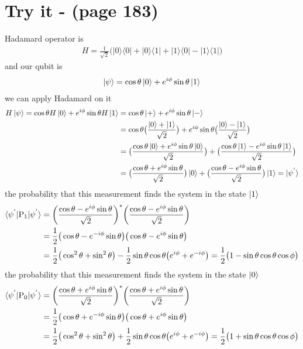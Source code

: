 \documentclass{article}
\newcommand{\op}[2]{|#1\rangle \langle#2|}
\newcommand{\sand}[3]{\braket{#1 | #2 | #3}}
\begin{document}
\section*{Try it - (page 183)}
Hadamard operator is 
\begin{align*}
   H = \frac{1}{\sqrt{2}}\big(\op{0}{0}+\op{0}{1}+\op{1}{0}-\op{1}{1}\big)
\end{align*}
and our qubit is
\begin{align*}
   \ket{\psi} = \cos\theta\ket{0} + e^{i\phi}\sin\theta\ket{1}
\end{align*}
we can apply Hadamard on it
\begin{align*}
   H\ket{\psi} = \cos\theta H\ket{0} + e^{i\phi}\sin\theta H\ket{1} &= \cos\theta \ket{+} + e^{i\phi}\sin\theta \ket{-} \\
   &= \cos\theta \big(\frac{\ket{0}+\ket{1}}{\sqrt{2}}\big) + e^{i\phi}\sin\theta \big(\frac{\ket{0}-\ket{1}}{\sqrt{2}}\big) \\
   &= \big(\frac{\cos\theta\ket{0}+e^{i\phi}\sin\theta\ket{0}}{\sqrt{2}}\big) + \big(\frac{\cos\theta\ket{1}-e^{i\phi}\sin\theta\ket{1}}{\sqrt{2}}\big) \\
   &= \big(\frac{\cos\theta+e^{i\phi}\sin\theta}{\sqrt{2}}\big)\ket{0} +  \big(\frac{\cos\theta-e^{i\phi}\sin\theta}{\sqrt{2}}\big)\ket{1} = \ket{\psi^{'}}
\end{align*}
the probability that this measurement finds the system in the state $\ket{1}$
\begin{align*}
   \sand{\psi^{'}}{\text{P}_1}{\psi^{'}} &= \bigg(\frac{\cos\theta-e^{i\phi}\sin\theta}{\sqrt{2}}\bigg)^{*}\bigg(\frac{\cos\theta-e^{i\phi}\sin\theta}{\sqrt{2}}\bigg) \\
   &= \frac{1}{2}\big(\cos\theta-e^{-i\phi}\sin\theta\big)\big(\cos\theta-e^{i\phi}\sin\theta\big) \\
   &= \frac{1}{2}\big(\cos^2\theta + \sin^2\theta \big) - \frac{1}{2}\sin\theta\cos\theta\big(e^{i\phi}+e^{-i\phi}\big) = \frac{1}{2}\big(1 - \sin\theta\cos\theta\cos\phi\big)
\end{align*}
the probability that this measurement finds the system in the state $\ket{0}$
\begin{align*}
   \sand{\psi^{'}}{\text{P}_0}{\psi^{'}} &= \bigg(\frac{\cos\theta+e^{i\phi}\sin\theta}{\sqrt{2}}\bigg)^{*}\bigg(\frac{\cos\theta+e^{i\phi}\sin\theta}{\sqrt{2}}\bigg) \\
   &= \frac{1}{2}\big(\cos\theta+e^{-i\phi}\sin\theta\big)\big(\cos\theta+e^{i\phi}\sin\theta\big) \\
   &= \frac{1}{2}\big(\cos^2\theta + \sin^2\theta \big) + \frac{1}{2}\sin\theta\cos\theta\big(e^{i\phi}+e^{-i\phi}\big) = \frac{1}{2}\big(1 + \sin\theta\cos\theta\cos\phi\big)
\end{align*}
\end{document}
